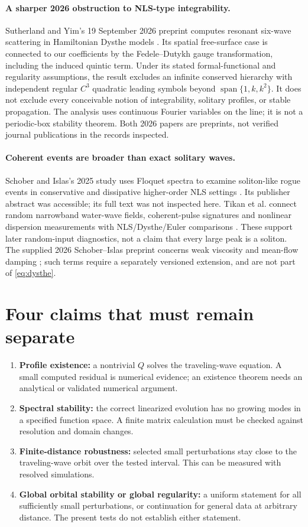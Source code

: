 \documentclass[11pt]{article}
\begin{document}
\paragraph{A sharper 2026 obstruction to NLS-type integrability.}
Sutherland and Yim's 19 September 2026 preprint computes resonant six-wave
scattering in Hamiltonian Dysthe models \cite{sy}. Its spatial free-surface
case is connected to our coefficients by the Fedele--Dutykh gauge transformation,
including the induced quintic term. Under its stated formal-functional and
regularity assumptions, the result excludes an infinite conserved hierarchy
with independent regular $C^3$ quadratic leading symbols beyond
$\operatorname{span}\{1,k,k^2\}$. It does not exclude every conceivable notion of
integrability, solitary profiles, or stable propagation. The analysis uses
continuous Fourier variables on the line; it is not a periodic-box stability
theorem. Both 2026 papers are preprints, not verified journal publications in
the records inspected.

\paragraph{Coherent events are broader than exact solitary waves.}
Schober and Islas's 2025 study uses Floquet spectra to examine soliton-like rogue
events in conservative and dissipative higher-order NLS settings \cite{si2025}.
Its publisher abstract was accessible; its full text was not inspected here.
Tikan et al. connect random narrowband water-wave fields, coherent-pulse signatures
and nonlinear dispersion measurements with NLS/Dysthe/Euler comparisons
\cite{tikan}. These support later random-input diagnostics, not a claim that
every large peak is a soliton. The supplied 2026 Schober--Islas preprint concerns
weak viscosity and mean-flow damping \cite{si2026}; such terms require a
separately versioned extension, and are not part of \eqref{eq:dysthe}.

\newpage
\section{Four claims that must remain separate}
\begin{enumerate}
\item \textbf{Profile existence:} a nontrivial $Q$ solves the traveling-wave
equation. A small computed residual is numerical evidence; an existence theorem
needs an analytical or validated numerical argument.
\item \textbf{Spectral stability:} the correct linearized evolution has no
growing modes in a specified function space. A finite matrix calculation must
be checked against resolution and domain changes.
\item \textbf{Finite-distance robustness:} selected small perturbations stay
close to the traveling-wave orbit over the tested interval. This can be measured
with resolved simulations.
\item \textbf{Global orbital stability or global regularity:} a uniform statement
for all sufficiently small perturbations, or continuation for general data at
arbitrary distance. The present tests do not establish either statement.
\end{enumerate}
\end{document}
